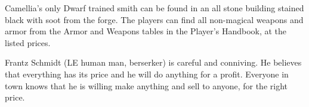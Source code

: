 Camellia's only Dwarf trained smith can be found in an all stone building stained black with soot from the forge.
The players can find all non-magical weapons and armor from the Armor and Weapons tables in the Player's Handbook, at the listed prices.

Frantz Schmidt (LE human man, berserker) is careful and conniving.
He believes that everything has its price and he will do anything for a profit.
Everyone in town knows that he is willing make anything and sell to anyone, for the right price.
